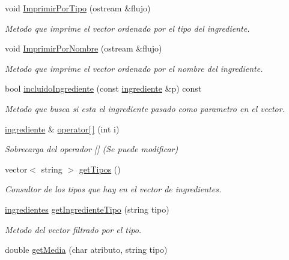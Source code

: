 \begin{DoxyCompactItemize}
void \hyperlink{classingredientes_a683d032576cbc230c210aa51cdbcc93e}{Imprimir\+Por\+Tipo} (ostream \&flujo)
\begin{DoxyCompactList}\small\item\em Metodo que imprime el vector ordenado por el tipo del ingrediente. \end{DoxyCompactList}\item 
void \hyperlink{classingredientes_adefafd151edf8a8997bca2dc22057ece}{Imprimir\+Por\+Nombre} (ostream \&flujo)
\begin{DoxyCompactList}\small\item\em Metodo que imprime el vector ordenado por el nombre del ingrediente. \end{DoxyCompactList}\item 
bool \hyperlink{classingredientes_a6d3f30e2e79299a970c705f61a8ee4d7}{incluido\+Ingrediente} (const \hyperlink{classingrediente}{ingrediente} \&p) const
\begin{DoxyCompactList}\small\item\em Metodo que busca si esta el ingrediente pasado como parametro en el vector. \end{DoxyCompactList}\item 
\hyperlink{classingrediente}{ingrediente} \& \hyperlink{classingredientes_a9e099786f83d0ac3cf38317b194691db}{operator\mbox{[}$\,$\mbox{]}} (int i)
\begin{DoxyCompactList}\small\item\em Sobrecarga del operador \mbox{[}\mbox{]} (Se puede modificar) \end{DoxyCompactList}\item 
vector$<$ string $>$ \hyperlink{classingredientes_a57594cb6c675d23f7894fe6388c95a7f}{get\+Tipos} ()
\begin{DoxyCompactList}\small\item\em Consultor de los tipos que hay en el vector de ingredientes. \end{DoxyCompactList}\item 
\hyperlink{classingredientes}{ingredientes} \hyperlink{classingredientes_a160ecb07facb16cbe7369ea797c67549}{get\+Ingrediente\+Tipo} (string tipo)
\begin{DoxyCompactList}\small\item\em Metodo del vector filtrado por el tipo. \end{DoxyCompactList}\item 
double \hyperlink{classingredientes_aa124bb75b0ff0b233d313fce58668868}{get\+Media} (char atributo, string tipo)

\end{DoxyCompactItemize}
